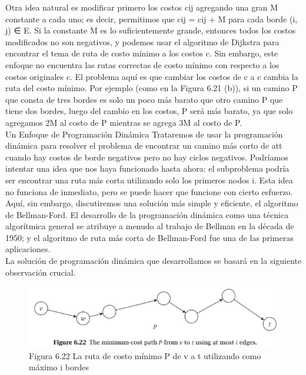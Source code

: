 \documentclass[a4paper]{article}
\begin{document}
Otra idea natural es modificar primero los costos cij agregando una gran M constante a cada uno; es decir, permitimos que cij = cij + M para cada borde (i, j) ∈ E. Si la constante M es lo suficientemente grande, entonces todos los costos modificados no son negativos, y podemos usar el algoritmo de Dijkstra para encontrar el tema de ruta de costo mínimo a los costos c. Sin embargo, este enfoque no encuentra las rutas correctas de costo mínimo con respecto a los costos originales c. El problema aquí es que cambiar los costos de c a c cambia la ruta del costo mínimo. Por ejemplo (como en la Figura 6.21 (b)), si un camino P que consta de tres bordes es solo un poco más barato que otro camino P que tiene dos bordes, luego del cambio en los costos, P será más barato, ya que solo agregamos 2M al costo de P mientras se agrega 3M al costo de P.\\

Un Enfoque de Programación Dinámica Trataremos de usar la programación dinámica para resolver el problema de encontrar un camino más corto de att cuando hay costos de borde negativos pero no hay ciclos negativos. Podríamos intentar una idea que nos haya funcionado hasta ahora: el subproblema podría ser encontrar una ruta más corta utilizando solo los primeros nodos i. Esta idea no funciona de inmediato, pero se puede hacer que funcione con cierto esfuerzo. Aquí, sin embargo, discutiremos una solución más simple y eficiente, el algoritmo de Bellman-Ford. El desarrollo de la programación dinámica como una técnica algorítmica general se atribuye a menudo al trabajo de Bellman en la década de 1950; y el algoritmo de ruta más corta de Bellman-Ford fue una de las primeras aplicaciones.\\

La solución de programación dinámica que desarrollamos se basará en la siguiente observación crucial.\\

\begin{figure}[h]
\centering
\includegraphics[scale=1]{Imagenes-Seccion6/fig6_22.PNG}
\caption{Figura 6.22 La ruta de costo mínimo P de v a t utilizando como máximo i bordes}
\end{figure}
\end{document}
